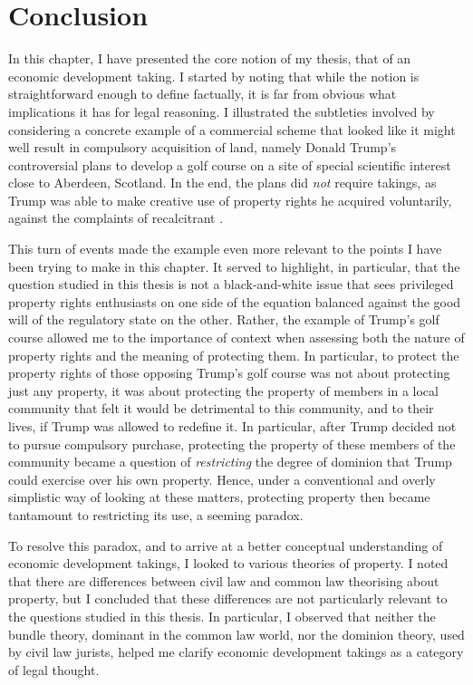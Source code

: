 \section{Conclusion}\label{sec:conc1}

In this chapter, I have presented the core notion of my thesis, that of an economic development taking. I started by noting that while the notion is straightforward enough to define factually, it is far from obvious what implications it has for legal reasoning. I illustrated the subtleties involved by considering a concrete example of a commercial scheme that looked like it might well result in compulsory acquisition of land, namely Donald Trump's controversial plans to develop a golf course on a site of special scientific interest close to Aberdeen, Scotland. In the end, the plans did {\it not} require takings, as Trump was able to make creative use of property rights he acquired voluntarily, against the complaints of recalcitrant .

This turn of events made the example even more relevant to the points I have been trying to make in this chapter. It served to highlight, in particular, that the question studied in this thesis is not a black-and-white issue that sees privileged property rights enthusiasts on one side of the equation balanced against the good will of the regulatory state on the other. Rather, the example of Trump's golf course allowed me to  the importance of context when assessing both the nature of property rights and the meaning of protecting them. In particular, to protect the property rights of those opposing Trump's golf course was not about protecting just any property, it was about protecting the property of members in a local community that felt it would be detrimental to this community, and to their lives, if Trump was allowed to redefine it. In particular, after Trump decided not to pursue compulsory purchase, protecting the property of these members of the community became a question of {\it restricting} the degree of dominion that Trump could exercise over his own property. Hence, under a conventional and overly simplistic way of looking at these matters, protecting property then became tantamount to restricting its use, a seeming paradox.

To resolve this paradox, and to arrive at a better conceptual understanding of economic development takings, I looked to various theories of property. I noted that there are differences between civil law and common law theorising about property, but I concluded that these differences are not particularly relevant to the questions studied in this thesis. In particular, I observed that neither the bundle theory, dominant in the common law world, nor the dominion theory, used by civil law jurists, helped me clarify economic development takings as a category of legal thought.

